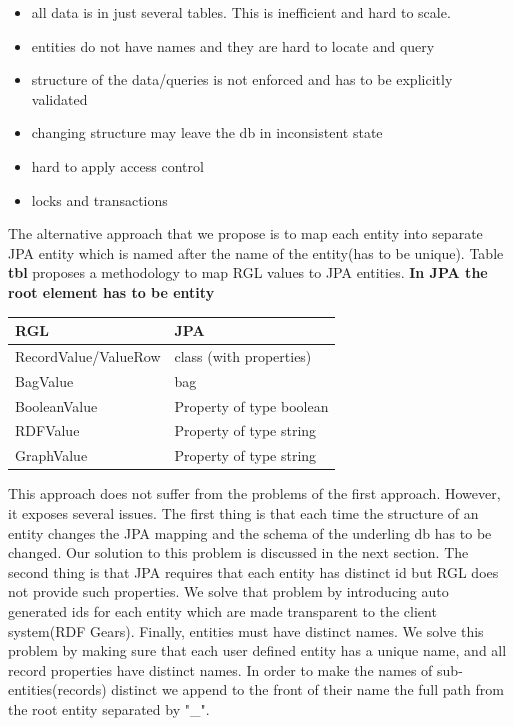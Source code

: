 \documentclass[a4paper, notitlepage]{article}
\begin{document}
\begin{itemize}
	\item all data is in just several tables. This is inefficient and hard to scale.
	\item entities do not have names and they are hard to locate and query
	\item structure of the data/queries is not enforced and has to be explicitly validated
	\item changing structure may leave the db in inconsistent state
	\item hard to apply access control
	\item locks and transactions
\end{itemize}

The alternative approach that we propose is to map each entity into separate JPA entity which is named after the name of the entity(has to be unique). Table \textbf{tbl} proposes a methodology to map RGL values to JPA entities. \textbf{In JPA the root element has to be entity}

\begin{center}
    \begin{tabular}{ | l | l |}
    \hline
    RGL & JPA  \\ \hline
    RecordValue/ValueRow & class (with properties)  \\ \hline
    BagValue & bag  \\ \hline
    BooleanValue & Property of type boolean  \\ \hline
    RDFValue & Property of type string  \\ \hline
	GraphValue & Property of type string  \\ \hline
    \end{tabular}
\end{center}

This approach does not suffer from the problems of the first approach. However, it exposes several issues. The first thing is that each time the structure of an entity changes the JPA mapping and the schema of the underling db has to be changed. Our solution to this problem is discussed in the next section. The second thing is that JPA requires that each entity has distinct id but RGL does not provide such properties. We solve that problem by introducing auto generated ids for each entity which are made transparent to the client system(RDF Gears). Finally, entities must have distinct names. We solve this problem by making sure that each user defined entity has a unique name, and all record properties have distinct names. In order to make the names of sub-entities(records) distinct we append to the front of their name the full path from the root entity separated by "\_".
\end{document}
